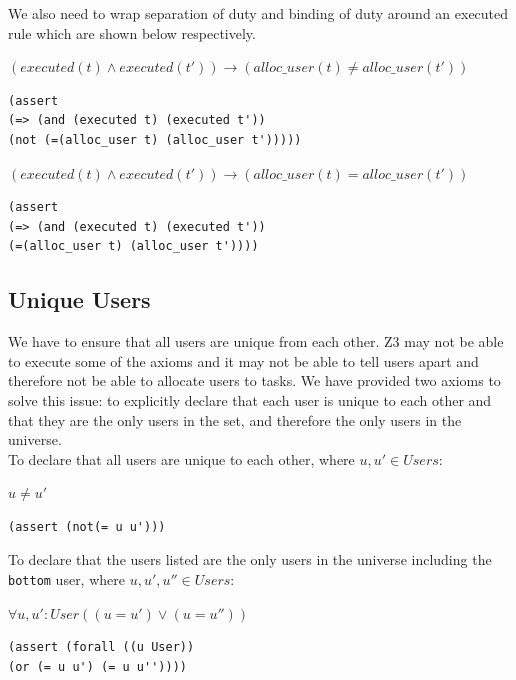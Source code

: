 \documentclass[a4paper]{report}
\begin{document}
We also need to wrap separation of duty and binding of duty around an executed rule which are shown below respectively. 
\begin{center}
$(executed(t) \wedge executed(t\ensuremath{'})) \longrightarrow (alloc\_user(t) \neq alloc\_user(t\ensuremath{'}))$
\end{center}
\begin{lstlisting}[frame=single]
(assert 
(=> (and (executed t) (executed t'))
(not (=(alloc_user t) (alloc_user t')))))
\end{lstlisting}
\begin{center}
$(executed(t) \wedge executed(t\ensuremath{'})) \longrightarrow (alloc\_user(t) = alloc\_user(t\ensuremath{'}))$
\end{center}
\begin{lstlisting}[frame=single]
(assert 
(=> (and (executed t) (executed t'))
(=(alloc_user t) (alloc_user t'))))
\end{lstlisting}

\subsection{Unique Users}
We have to ensure that all users are unique from each other. Z3 may not be able to execute some of the axioms and it may not be able to tell users apart and therefore not be able to allocate users to tasks. We have provided two axioms to solve this issue: to explicitly declare that each user is unique to each other and that they are the only users in the set, and therefore the only users in the universe.\\

To declare that all users are unique to each other, where $u, u\ensuremath{'} \in Users$:
\begin{center}
$u \neq u\ensuremath{'}$
\end{center}
\begin{lstlisting}[frame=single]
(assert (not(= u u')))
\end{lstlisting}

To declare that the users listed are the only users in the universe including the \texttt{bottom} user, where $u, u\ensuremath{'}, u\ensuremath{''} \in Users$: 
\begin{center}
$\forall u, u\ensuremath{'} : User ((u = u\ensuremath{'}) \vee (u = u\ensuremath{''}))$
\end{center}
\begin{lstlisting}[frame=single]
(assert (forall ((u User)) 
(or (= u u') (= u u''))))
\end{lstlisting}
\end{document}
